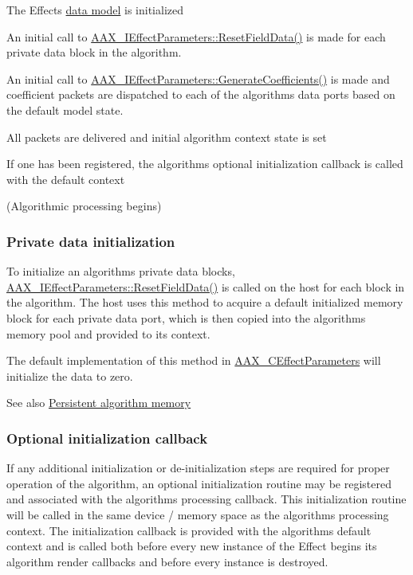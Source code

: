  \begin{DoxyItemize}
\item The Effect\textquotesingle{}s \hyperlink{a00328}{data model} is initialized \item An initial call to \hyperlink{a00061_a6e87e40d42c7431e52ae5ebd4f631964}{A\+A\+X\+\_\+\+I\+Effect\+Parameters\+::\+Reset\+Field\+Data()} is made for each private data block in the algorithm. \item An initial call to \hyperlink{a00061_a083265b008921b6114ede387711694b7}{A\+A\+X\+\_\+\+I\+Effect\+Parameters\+::\+Generate\+Coefficients()} is made and coefficient packets are dispatched to each of the algorithm\textquotesingle{}s data ports based on the default model state. \item All packets are delivered and initial algorithm context state is set \item If one has been registered, the algorithm\textquotesingle{}s optional initialization callback is called with the default context \item (Algorithmic processing begins)\end{DoxyItemize}
\hypertarget{a00327_alg_initialization_private_data}{}\subsubsection{Private data initialization}\label{a00327_alg_initialization_private_data}
 To initialize an algorithm\textquotesingle{}s private data blocks, \hyperlink{a00061_a6e87e40d42c7431e52ae5ebd4f631964}{A\+A\+X\+\_\+\+I\+Effect\+Parameters\+::\+Reset\+Field\+Data()} is called on the host for each block in the algorithm. The host uses this method to acquire a default initialized memory block for each private data port, which is then copied into the algorithm\textquotesingle{}s memory pool and provided to its context.

 The default implementation of this method in \hyperlink{a00018_accef965824c9b158cafb65e59e216b6a}{A\+A\+X\+\_\+\+C\+Effect\+Parameters} will initialize the data to zero.

 \begin{DoxySeeAlso}{See also}
\hyperlink{a00327_alg_pd}{Persistent algorithm memory}
\end{DoxySeeAlso}
\hypertarget{a00327_alg_initialization_optional_callback}{}\subsubsection{Optional initialization callback}\label{a00327_alg_initialization_optional_callback}
 If any additional initialization or de-\/initialization steps are required for proper operation of the algorithm, an optional initialization routine may be registered and associated with the algorithm\textquotesingle{}s processing callback. This initialization routine will be called in the same device / memory space as the algorithm\textquotesingle{}s processing context. The initialization callback is provided with the algorithm\textquotesingle{}s default context and is called both before every new instance of the Effect begins its algorithm render callbacks and before every instance is destroyed.

